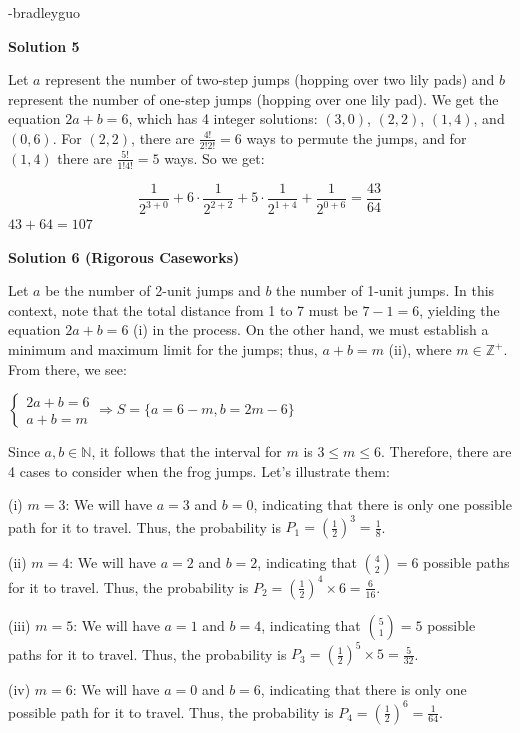 \begin{enumerate}
 -bradleyguo

 



\textbf{Solution 5}

Let $a$ represent the number of two-step jumps (hopping over two lily pads) and $b$ represent the number of one-step jumps (hopping over one lily pad). We get the equation $2a + b = 6$, which has 4 integer solutions: $(3,0)$, $(2,2)$, $(1,4)$, and $(0,6)$. For $(2,2)$, there are $\frac{4!}{2!2!} = 6$ ways to permute the jumps, and for $(1,4)$ there are $\frac{5!}{1!4!} = 5$ ways. So we get:

 
 \[\frac{1}{2^{3+0}} + 6 \cdot \frac{1}{2^{2 + 2}} + 5 \cdot \frac{1}{2^{1 +4}} + \frac{1}{2^{0 + 6}} = \frac{43}{64}\]
$43 + 64 = \boxed{107}$




\textbf{Solution 6 (Rigorous Caseworks)}

Let $a$ be the number of 2-unit jumps and $b$ the number of 1-unit jumps. In this context, note that the total distance from 1 to 7 must be $7 - 1 = 6$, yielding the equation $2a + b = 6$ (i) in the process. On the other hand, we must establish a minimum and maximum limit for the jumps; thus, $a + b = m$ (ii), where $m \in \mathbb{Z}^+$. From there, we see:

 $\begin{cases}  2a + b = 6 \\  a + b = m  \end{cases} \Rightarrow \boxed{S = \{a = 6 - m, b = 2m - 6\}}$

 Since $a, b \in \mathbb{N}$, it follows that the interval for $m$ is $3 \le m \le 6$. Therefore, there are 4 cases to consider when the frog jumps. Let's illustrate them:

 
(i) $m = 3$: We will have $a = 3$ and $b = 0$, indicating that there is only one possible path for it to travel. Thus, the probability is $P_1 = \left(\frac{1}{2}\right)^3 = \frac{1}{8}$.

 (ii) $m = 4$: We will have $a = 2$ and $b = 2$, indicating that $\binom{4}{2} = 6$ possible paths for it to travel. Thus, the probability is $P_2 = \left(\frac{1}{2}\right)^4 \times 6 = \frac{6}{16}$.

 (iii) $m = 5$: We will have $a = 1$ and $b = 4$, indicating that $\binom{5}{1} = 5$ possible paths for it to travel. Thus, the probability is $P_3 = \left(\frac{1}{2}\right)^5 \times 5 = \frac{5}{32}$.

 (iv) $m = 6$: We will have $a = 0$ and $b = 6$, indicating that there is only one possible path for it to travel. Thus, the probability is $P_4 = \left(\frac{1}{2}\right)^6 = \frac{1}{64}$.


\end{enumerate}
